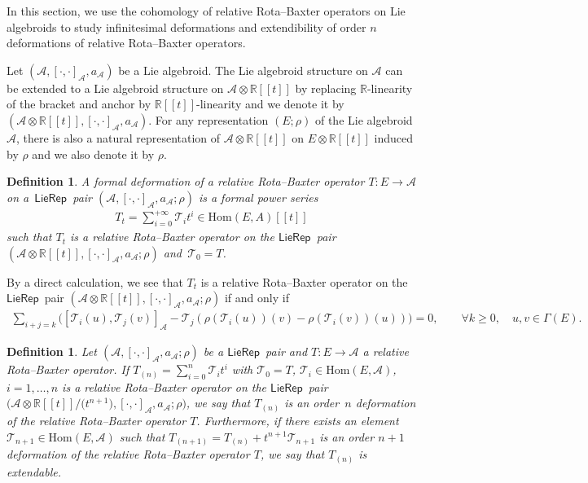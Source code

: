 \documentclass[pdftex]{sigma}%
\numberwithin{equation}{section}
\newtheorem{defi}[thm]{Definition}
\newcommand{\Real}{\mathbb R}
\newcommand{\huaA}{\mathcal{A}}
\newcommand{\huaT}{\mathcal{T}}
\newcommand{\Hom}{\mathrm{Hom}}
\newcommand{\LP}{$\mathsf{LieRep}$~}
\begin{document}
In this section, we use the cohomology of relative Rota--Baxter operators on Lie algebroids to study infinitesimal deformations and extendibility of order $n$ deformations of relative Rota--Baxter operators.

Let $(\huaA,[\cdot,\cdot]_\huaA,a_\huaA)$ be a Lie algebroid. The Lie algebroid structure on $\huaA$ can be extended to a Lie algebroid structure on $\huaA\otimes \Real[[t]]$ by replacing $\Real$-linearity of the bracket and anchor by $\Real[[t]]$-linearity and we denote it by $(\huaA\otimes \Real[[t]],[\cdot,\cdot]_\huaA,a_\huaA)$. For any representation $(E;\rho)$ of the Lie algebroid $\huaA$, there is also a natural representation of $\huaA\otimes \Real[[t]]$ on $E\otimes \Real[[t]]$ induced by $\rho$ and we also denote it by $\rho$.


\begin{defi}%
 A {\it formal deformation} of a relative Rota--Baxter operator $T\colon E\longrightarrow \huaA$ on a~\LP pair $(\huaA,[\cdot,\cdot]_\huaA,a_\huaA;\rho)$ is a formal power series
 \begin{gather*}
 T_t=\sum_{i=0}^{+\infty}\huaT_it^i\in \Hom(E,A) [[t]]
 \end{gather*}
 such that $T_t$ is a relative Rota--Baxter operator on the \LP pair $(\huaA\otimes \Real[[t]],[\cdot,\cdot]_\huaA,a_\huaA;\rho)$ and~$\huaT_0=T$.
\end{defi}

By a direct calculation, we see that $T_t$ is a relative Rota--Baxter operator on the \LP pair $(\huaA\otimes \Real[[t]],[\cdot,\cdot]_\huaA,a_\huaA;\rho)$ if and only if
\begin{gather}\label{eq:equivalent form}
\sum_{i+j=k}\!\!\big([\huaT_i(u),\huaT_j(v)]_\huaA-\huaT_j(\rho(\huaT_i(u))(v)-\rho(\huaT_i(v))(u))\big)=0,
\qquad \forall k\geq0,\quad u,v\in\Gamma(E).\!\!
\end{gather}

\begin{defi}%
 Let $(\huaA,[\cdot,\cdot]_\huaA,a_\huaA;\rho)$ be a \LP pair and $T\colon E\longrightarrow \huaA$ a relative Rota--Baxter operator. If $T_{(n)}=\sum_{i=0}^{n}\huaT_it^i$ with $\huaT_0=T$, $\huaT_i\in\Hom(E,\huaA)$, $i=1,\dots,n$ is a relative Rota--Baxter operator on the \LP pair $\big(\huaA\otimes \Real[[t]]/\big(t^{n+1}\big),[\cdot,\cdot]_\huaA,a_\huaA;\rho\big)$, we say that $T_{(n)}$ is an {\it order~$n$ deformation} of the relative Rota--Baxter operator $T$. Furthermore, if there exists an element $\huaT_{n+1}\in \Hom(E,\huaA)$ such that $T_{(n+1)}=T_{(n)}+t^{n+1}\huaT_{n+1}$ is an order $n+1$ deformation of the relative Rota--Baxter operator $T$, we say that $T_{(n)}$ is {\it extendable}.
\end{defi}
\end{document}
